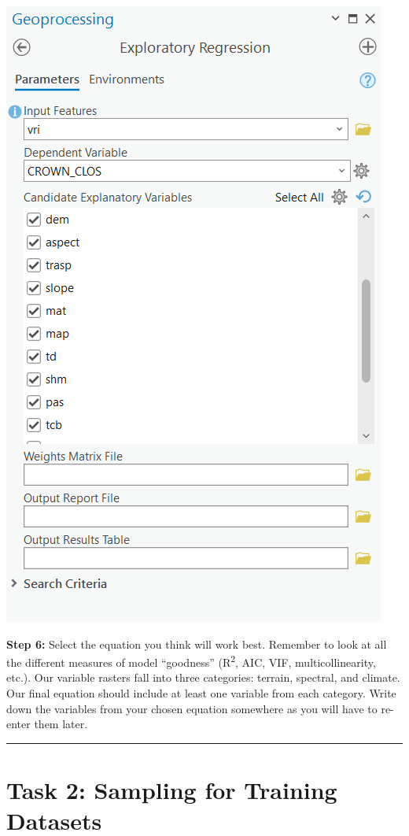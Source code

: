\documentclass[
]{book}
\begin{document}
\includegraphics[width=0.75\linewidth]{images/04-exploratory-regression}

\textbf{Step 6:} Select the equation you think will work best. Remember to look at all the different measures of model ``goodness'' (R\textsuperscript{2}, AIC, VIF, multicollinearity, etc.). Our variable rasters fall into three categories: terrain, spectral, and climate. Our final equation should include at least one variable from each category. Write down the variables from your chosen equation somewhere as you will have to re-enter them later.

\begin{center}\rule{0.5\linewidth}{0.5pt}\end{center}

\hypertarget{task-2-sampling-for-training-datasets}{%
\section*{Task 2: Sampling for Training Datasets}\label{task-2-sampling-for-training-datasets}}
\end{document}
